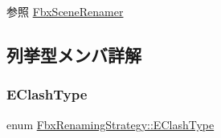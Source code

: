 \begin{DoxySeeAlso}{参照}
\hyperlink{class_fbx_scene_renamer}{Fbx\+Scene\+Renamer} 
\end{DoxySeeAlso}


\subsection{列挙型メンバ詳解}
\mbox{\label{class_fbx_renaming_strategy_aacebe214cec13a6cdbbc9e40d16c57dd}} 
\subsubsection{\texorpdfstring{E\+Clash\+Type}{EClashType}}
{\footnotesize\ttfamily enum \hyperlink{class_fbx_renaming_strategy_aacebe214cec13a6cdbbc9e40d16c57dd}{Fbx\+Renaming\+Strategy\+::\+E\+Clash\+Type}}


